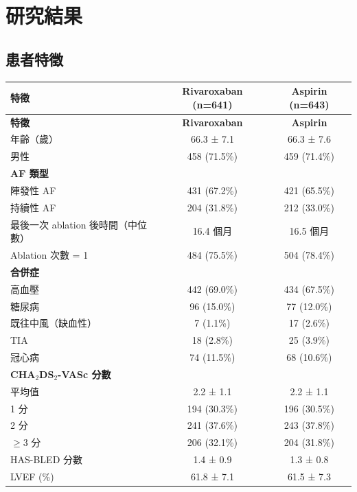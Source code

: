 \documentclass[12pt,a4paper]{article}
\begin{document}
\section{研究結果}

\subsection{患者特徵}

\begin{longtable}{p{6cm}cc}
\toprule
\textbf{特徵} & \textbf{Rivaroxaban (n=641)} & \textbf{Aspirin (n=643)} \\
\midrule
\endfirsthead
\toprule
\textbf{特徵} & \textbf{Rivaroxaban} & \textbf{Aspirin} \\
\midrule
\endhead
\bottomrule
\endfoot

年齡（歲） & 66.3 ± 7.1 & 66.3 ± 7.6 \\
男性 & 458 (71.5\%) & 459 (71.4\%) \\
\midrule
\textbf{AF 類型} & & \\
陣發性 AF & 431 (67.2\%) & 421 (65.5\%) \\
持續性 AF & 204 (31.8\%) & 212 (33.0\%) \\
\midrule
最後一次 ablation 後時間（中位數） & 16.4 個月 & 16.5 個月 \\
Ablation 次數 = 1 & 484 (75.5\%) & 504 (78.4\%) \\
\midrule
\textbf{合併症} & & \\
高血壓 & 442 (69.0\%) & 434 (67.5\%) \\
糖尿病 & 96 (15.0\%) & 77 (12.0\%) \\
既往中風（缺血性） & 7 (1.1\%) & 17 (2.6\%) \\
TIA & 18 (2.8\%) & 25 (3.9\%) \\
冠心病 & 74 (11.5\%) & 68 (10.6\%) \\
\midrule
\textbf{CHA$_2$DS$_2$-VASc 分數} & & \\
平均值 & 2.2 ± 1.1 & 2.2 ± 1.1 \\
1 分 & 194 (30.3\%) & 196 (30.5\%) \\
2 分 & 241 (37.6\%) & 243 (37.8\%) \\
$\geq$3 分 & 206 (32.1\%) & 204 (31.8\%) \\
\midrule
HAS-BLED 分數 & 1.4 ± 0.9 & 1.3 ± 0.8 \\
LVEF (\%) & 61.8 ± 7.1 & 61.5 ± 7.3 \\
\bottomrule
\end{longtable}
\end{document}
